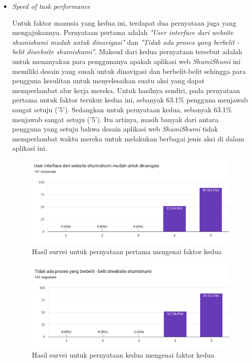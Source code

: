 \documentclass[a4paper]{article}
\begin{document}
\begin{enumerate}
\begin{itemize}
        \item \textit{Speed of task performance}
        
        Untuk faktor manusia yang kedua ini, terdapat dua pernyataan juga yang mengajukannya. Pernyataan pertama adalah \textit{"User interface dari website shumishumi mudah untuk dinavigasi"} dan \textit{"Tidak ada proses yang berbelit - belit diwebsite shumishumi"}. Maksud dari kedua pernyataan tersebut adalah untuk menanyakan para penggunanya apakah aplikasi web \textit{ShumiShumi} ini memiliki desain yang susah untuk dinavigasi dan berbelit-belit sehingga para pengguna kesulitan untuk menyelesaikan suatu aksi yang dapat memperlambat alur kerja mereka. Untuk hasilnya sendiri, pada pernyataan pertama untuk faktor terukur kedua ini, sebanyak 63.1\% pengguna menjawab sangat setuju ('5'). Sedangkan untuk pernyataan kedua, sebanyak 63.1\% menjawab sangat setuju ('5'). Itu artinya, masih banyak dari antara pengguna yang setuju bahwa desain aplikasi web \textit{ShumiShumi} tidak memperlambat waktu mereka untuk melakukan berbagai jenis aksi di dalam aplikasi ini. 

        \begin{figure}[h]
            \centering
            \includegraphics[scale=0.50]{images/evaluasi ui user 2/Survei 2 - Pertanyaan 7.png}
            \caption{Hasil survei untuk pernyataan pertama mengenai faktor kedua}
        \end{figure}

        \begin{figure}[h]
            \centering
            \includegraphics[scale=0.50]{images/evaluasi ui user 2/Survei 2 - Pertanyaan 9.png}
            \caption{Hasil survei untuk pernyataan kedua mengenai faktor kedua}
        \end{figure}


\end{itemize}
\end{enumerate}
\end{document}
